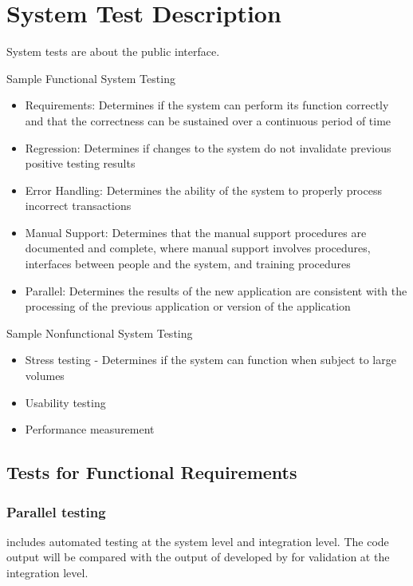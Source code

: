 \documentclass[12pt, titlepage]{article}
\begin{document}
\section{System Test Description}

System tests are about the public interface.

Sample Functional System Testing
\begin{itemize}
\item Requirements: Determines if the system can perform its function correctly and that the correctness can be sustained over a continuous period of time
\item Regression: Determines if changes to the system do not invalidate previous positive testing results
\item Error Handling: Determines the ability of the system to properly process
  incorrect transactions
\item Manual Support: Determines that the manual support procedures are documented and complete, where manual support involves procedures, interfaces between people and the system, and training procedures
\item Parallel: Determines the results of the new application are consistent with the processing of the previous application or version of the application
\end{itemize}

Sample Nonfunctional System Testing
\begin{itemize}
\item Stress testing - Determines if the system can function when subject to large volumes
\item Usability testing
\item Performance measurement
\end{itemize}

\subsection{Tests for Functional Requirements}

\subsubsection{Parallel testing}

 includes automated testing at the system level
and integration level. The code output
will be compared with the output of \rdcon developed by \cite{chang1982} for validation
at the integration level.
\end{document}
